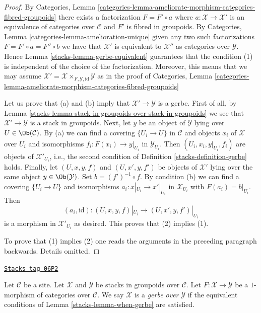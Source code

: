\begin{proof}

By
Categories, Lemma
\ref{categories-lemma-ameliorate-morphism-categories-fibred-groupoids}
there exists a factorization $F = F' \circ a$ where
$a : \mathcal{X} \to \mathcal{X}'$ is an equivalence of categories over
$\mathcal{C}$ and $F'$ is fibred in groupoids. By
Categories, Lemma \ref{categories-lemma-amelioration-unique}
given any two such factorizations $F = F' \circ a = F'' \circ b$
we have that $\mathcal{X}'$ is equivalent to $\mathcal{X}''$ as
categories over $\mathcal{Y}$. Hence
Lemma \ref{stacks-lemma-gerbe-equivalent}
guarantees that the condition (1) is independent of the choice of the
factorization. Moreover, this means that we may assume
$\mathcal{X}' = \mathcal{X} \times_{F, \mathcal{Y}, \text{id}} \mathcal{Y}$
as in the proof of
Categories, Lemma
\ref{categories-lemma-ameliorate-morphism-categories-fibred-groupoids}

\medskip\noindent
Let us prove that (a) and (b) imply that $\mathcal{X}' \to \mathcal{Y}$
is a gerbe. First of all, by
Lemma \ref{stacks-lemma-stack-in-groupoids-over-stack-in-groupoids}
we see that $\mathcal{X}' \to \mathcal{Y}$ is a stack in groupoids.
Next, let $y$ be an object of $\mathcal{Y}$ lying over
$U \in \Ob(\mathcal{C})$. By (a) we can find a covering
$\{U_i \to U\}$ in $\mathcal{C}$ and objects $x_i$ of $\mathcal{X}$
over $U_i$ and isomorphisms $f_i : F(x_i) \to y|_{U_i}$ in
$\mathcal{Y}_{U_i}$. Then $(U_i, x_i, y|_{U_i}, f_i)$ are objects
of $\mathcal{X}'_{U_i}$, i.e., the second condition of
Definition \ref{stacks-definition-gerbe}
holds. Finally, let $(U, x, y, f)$ and $(U, x', y, f')$ be objects
of $\mathcal{X}'$ lying over the same object $y \in \Ob(\mathcal{Y})$.
Set $b = (f')^{-1} \circ f$. By condition (b) we can find a covering
$\{U_i \to U\}$ and isomorphisms $a_i : x|_{U_i} \to x'|_{U_i}$
in $\mathcal{X}_{U_i}$ with $F(a_i) = b|_{U_i}$. Then
$$
(a_i, \text{id}) : (U, x, y, f)|_{U_i} \to (U, x', y, f')|_{U_i}
$$
is a morphism in $\mathcal{X}'_{U_i}$ as desired. This proves that
(2) implies (1).

\medskip\noindent
To prove that (1) implies (2) one reads the arguments
in the preceding paragraph backwards. Details omitted.
\end{proof}

\begin{definition}
\label{stacks-definition-gerbe-over-stack-in-groupoids}
\href{https://stacks.math.columbia.edu/tag/06P2}{\texttt{Stacks tag 06P2}}

Let $\mathcal{C}$ be a site. Let $\mathcal{X}$
and $\mathcal{Y}$ be stacks in groupoids over $\mathcal{C}$.
Let $F : \mathcal{X} \to \mathcal{Y}$ be a $1$-morphism of categories
over $\mathcal{C}$. We say $\mathcal{X}$ is a {\it gerbe over} $\mathcal{Y}$
if the equivalent conditions of
Lemma \ref{stacks-lemma-when-gerbe}
are satisfied.
\end{definition}

